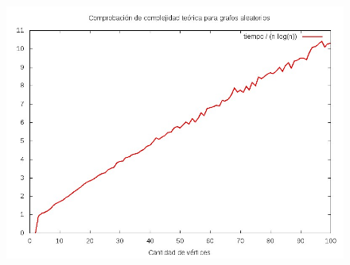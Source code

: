 \begin{figure}[H]
	\begin{minipage}[t]{\linewidth}
		\centering
		\includegraphics[width=\textwidth]{p3_complejidad_grafos_aleatorios.jpg}
		\label{fig:p3_complejidad_grafos_aleatorios}
	\end{minipage}
\end{figure}
